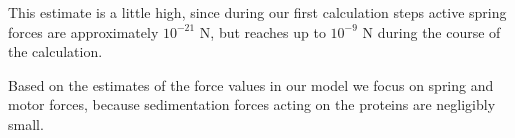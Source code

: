 This estimate is a little high, since during our first calculation steps active spring forces are approximately $10^{-21} \text{ N}$, but reaches up to $10^{-9} \text{ N}$ during the course of the calculation.

Based on the estimates of the force values in our model we focus on spring and motor forces, because sedimentation forces acting on the proteins are negligibly small.

